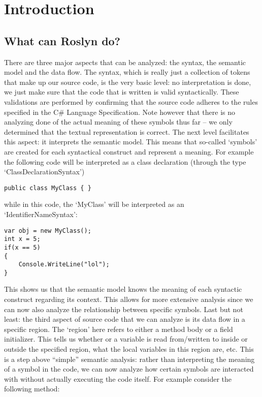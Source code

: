 \chapter{Introduction}
\label{ch:introduction}

\section{What can Roslyn do?}
\label{sec:intro-what}

There are three major aspects that can be analyzed: the syntax, the semantic model and the data flow. 
The syntax, which is really just a collection of tokens that make up our source code, is the very basic level: no interpretation is done, we just make sure that the code that is written is valid syntactically. These validations are performed by confirming that the source code adheres to the rules specified in the C\# Language Specification. Note however that there is no analyzing done of the actual meaning of these symbols thus far – we only determined that the textual representation is correct.
The next level facilitates this aspect: it interprets the semantic model. This means that so-called ‘symbols’ are created for each syntactical construct and represent a meaning. For example the following code will be interpreted as a class declaration (through the type ‘ClassDeclarationSyntax’)

\lstset{style=csharp}
\begin{lstlisting}
public class MyClass { }
\end{lstlisting}

	
while in this code, the ‘MyClass’ will be interpreted as an ‘IdentifierNameSyntax’:

   
\begin{lstlisting}
var obj = new MyClass();
int x = 5;
if(x == 5)
{
	Console.WriteLine("lol");
}
\end{lstlisting}  
	
This shows us that the semantic model knows the meaning of each syntactic construct regarding its context. This allows for more extensive analysis since we can now also analyze the relationship between specific symbols. 
Last but not least: the third aspect of source code that we can analyze is its data flow in a specific region. The ‘region’ here refers to either a method body or a field initializer. This tells us whether or a variable is read from/written to inside or outside the specified region, what the local variables in this region are, etc. This is a step above “simple” semantic analysis: rather than interpreting the meaning of a symbol in the code, we can now analyze how certain symbols are interacted with without actually executing the code itself.
For example consider the following method:

